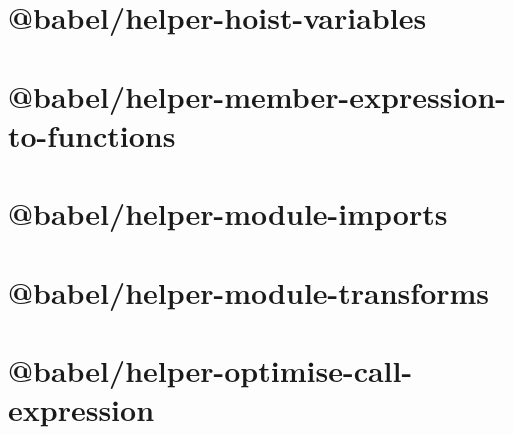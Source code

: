 \documentclass[twoside]{book}
\newcommand{\+}{\discretionary{\mbox{\scriptsize$\hookleftarrow$}}{}{}}
\begin{document}
\chapter{@babel/helper-\/hoist-\/variables}
\label{md__c___users_vaishnavi_jadhav__desktop__developer_code_mean_stack_example_client_node_modules__ca85c519a9ac78934477efcc65f465ac}

\chapter{@babel/helper-\/member-\/expression-\/to-\/functions}
\label{md__c___users_vaishnavi_jadhav__desktop__developer_code_mean_stack_example_client_node_modules__2fbe7e4c6d5572a55b3b27134596da93}

\chapter{@babel/helper-\/module-\/imports}
\label{md__c___users_vaishnavi_jadhav__desktop__developer_code_mean_stack_example_client_node_modules__258a4041c007e286572da4f54cbac78d}

\chapter{@babel/helper-\/module-\/transforms}
\label{md__c___users_vaishnavi_jadhav__desktop__developer_code_mean_stack_example_client_node_modules__06efc79ef6c9604b9b2905f0fc9f2473}

\chapter{@babel/helper-\/optimise-\/call-\/expression}
\label{md__c___users_vaishnavi_jadhav__desktop__developer_code_mean_stack_example_client_node_modules__241d26ed9ddb2b1c4c682aadd021db7e}

\end{document}
